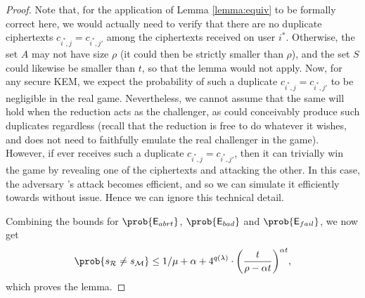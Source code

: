 \begin{proof}
  Note that, for the application of Lemma \ref{lemma:equiv} to be formally correct here,
  we would actually need to verify that there are no duplicate ciphertexts
  \(c_{i^{*},j} = c_{i^{*},j'}\) among the ciphertexts received on user \(i^{*}\).
  Otherwise, the set \(A\) may not have size \(\rho\)
  (it could then be strictly smaller than \(\rho\)),
  and the set \(S\) could likewise be smaller than \(t\),
  so that the lemma would not apply.
  Now, for any secure KEM, we expect the probability of such a
  duplicate \(c_{i^{*},j} = c_{i^{*},j'}\) to be negligible in the real \OWECPA game.
  Nevertheless, we cannot assume that the same will hold
  when the reduction \redR acts as the challenger,
  as \redR could conceivably produce such duplicates regardless
  (recall that the reduction is free to do whatever it wishes, and does not need to
  faithfully emulate the real challenger in the \OWECPA game).
  However, if \advA ever receives such a duplicate \(c_{i^{*},j} = c_{i^{*},j'}\),
  then it can trivially win the \OWECPA game by revealing one of the ciphertexts and attacking the other.
  In this case, the adversary \advA's attack becomes efficient,
  and so we can simulate it efficiently towards \redR without issue.
  Hence we can ignore this technical detail.

  Combining the bounds for \(\prob{\eventE_{abrt}}\), \(\prob{\eventE_{bad}}\) and \(\prob{\eventE_{fail}}\), we now get
  \[
    \prob{s_{\redR} \ne s_{\redM}} \le 1 / \mu + \alpha
    + 4^{q(\lambda)} \cdot \left( \frac{t}{\rho - \alpha t} \right)^{\alpha t},
  \]
  which proves the lemma.
\end{proof}

